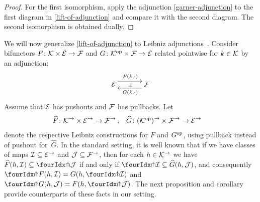 \documentclass[reqno,10pt,a4paper,oneside,draft]{amsart}
\begin{document}
\begin{proof}
For the first isomorphism, apply the adjunction \eqref{garner-adjunction} to the first diagram in \cref{lift-of-adjunction} and compare it with the second diagram.
The second isomorphism is obtained dually.
\end{proof}


We will now generalize \cref{lift-of-adjunction} to Leibniz adjunctions~\cite{riehl-verity:reedy}.
Consider bifunctors $F \co \cal{K} \times \cal{E} \to \cal{F}$ and $G \co \cal{K}^{\op} \times \cal{F} \to \cal{E}$ related pointwise for $k \in \cal{K}$ by an adjunction:
\[
\xymatrix@C+1em{
  \cal{E}
  \ar@<5pt>[r]^{F(k, \arghole)}
  \ar@{}[r]|{\bot}
&
  \cal{F}
  \ar@<5pt>[l]^{G(k, \arghole)}
}
\]
Assume that $\cal{E}$ has pushouts and $\cal{F}$ has pullbacks.
Let
\[
\begin{aligned}
  \widehat{F} &\co \cal{K}^\to \times \cal{E}^\to \to \cal{F}^\to
\, ,&
  \widehat{G} &\co (\cal{K}^{\op})^\to \times \cal{F}^\to \to \cal{E}^\to
\end{aligned}
\]
denote the respective Leibniz constructions for $F$ and $G^{\op}$, using pullback instead of pushout for~$\widehat{G}$.
In the standard setting, it is well known that if we have classes of maps $\cal{I} \subseteq \cal{E}^\to$ and $\cal{J} \subseteq \cal{F}^\to$, then for each $h \in \cal{K}^\to$ we have $\widehat{F}(h, \cal{I}) \subseteq \liftl{\cal{J}}$ if and only if $\liftr{\cal{I}} \subseteq \widehat{G}(h, \cal{J})$, and consequently $\liftr{F(h, \cal{I})} = G(h, \liftr{\cal{I}})$ and $\liftl{G(h, \cal{J})} = F(h, \liftl{\cal{J}})$.
The next proposition and corollary provide counterparts of these facts in our setting.
\end{document}
